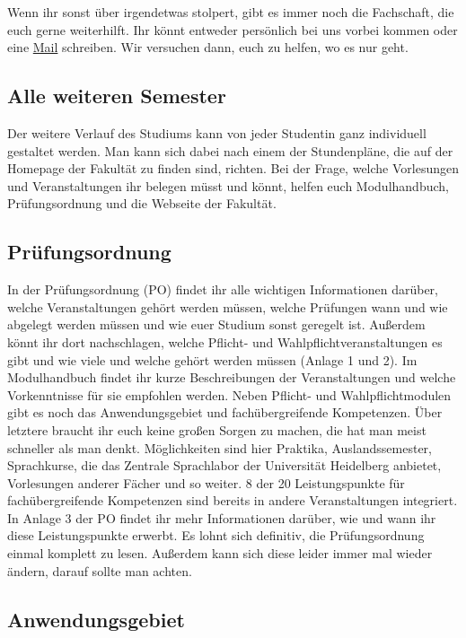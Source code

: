 Wenn ihr sonst über irgendetwas stolpert, gibt es immer noch die Fachschaft, die euch gerne weiterhilft. Ihr könnt entweder persönlich bei uns vorbei kommen oder eine \href{mailto:fachschaft@mathphys.info}{Mail} schreiben. Wir versuchen dann, euch zu helfen, wo es nur geht.

\subsection{Alle weiteren Semester}

Der weitere Verlauf des Studiums kann von jeder Studentin ganz individuell gestaltet werden. Man kann sich dabei nach einem der Stundenpläne, die auf der Homepage der Fakultät zu finden sind, richten. Bei der Frage, welche Vorlesungen und Veranstaltungen ihr belegen müsst und könnt, helfen euch Modulhandbuch, Prüfungsordnung und die Webseite der Fakultät.

\subsection{Prüfungsordnung}

In der Prüfungsordnung (\gls{PO}) findet ihr alle wichtigen Informationen darüber, welche Veranstaltungen gehört werden müssen, welche Prüfungen wann und wie abgelegt werden müssen und wie euer Studium sonst geregelt ist. Außerdem könnt ihr dort nachschlagen, welche Pflicht- und Wahlpflichtveranstaltungen es gibt und wie viele und welche gehört werden müssen (Anlage 1 und 2).  Im Modulhandbuch findet ihr kurze Beschreibungen der Veranstaltungen und welche Vorkenntnisse für sie empfohlen werden. Neben Pflicht- und Wahlpflichtmodulen gibt es noch das Anwendungsgebiet und fachübergreifende Kompetenzen. Über letztere braucht ihr euch keine großen Sorgen zu machen, die hat man meist schneller als man denkt. Möglichkeiten sind hier Praktika, Auslandssemester, Sprachkurse, die das Zentrale Sprachlabor der Universität Heidelberg anbietet, Vorlesungen anderer Fächer und so weiter. 8 der 20 Leistungspunkte für fachübergreifende Kompetenzen sind bereits in andere Veranstaltungen integriert. In Anlage 3 der PO findet ihr mehr Informationen darüber, wie und wann ihr diese Leistungspunkte erwerbt. Es lohnt sich definitiv, die Prüfungsordnung einmal komplett zu lesen. Außerdem kann sich diese leider immer mal wieder ändern, darauf sollte man achten.

\subsection{Anwendungsgebiet}

